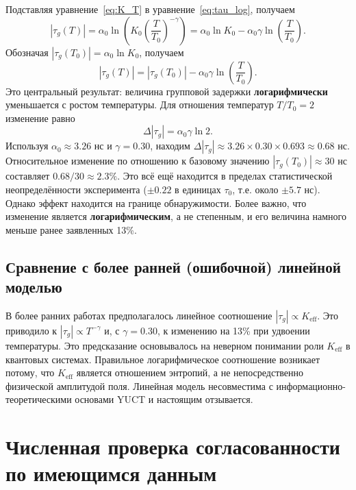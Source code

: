 \documentclass[12pt,a4paper]{article}
\newcommand{\Keff}{K_{\mathrm{eff}}}
\begin{document}
	Подставляя уравнение~\eqref{eq:K_T} в уравнение~\eqref{eq:tau_log}, получаем
	\begin{equation}
		|\tau_g(T)| = \alpha_0 \ln\!\left(K_0 \left(\frac{T}{T_0}\right)^{-\gamma}\right)
		= \alpha_0 \ln K_0 - \alpha_0 \gamma \ln\!\left(\frac{T}{T_0}\right).
	\end{equation}
	Обозначая \(|\tau_g(T_0)| = \alpha_0 \ln K_0\), получаем
	\begin{equation}
		|\tau_g(T)| = |\tau_g(T_0)| - \alpha_0 \gamma \ln\!\left(\frac{T}{T_0}\right).
		\label{eq:tau_T_log}
	\end{equation}
	Это центральный результат: величина групповой задержки \textbf{логарифмически} уменьшается с ростом температуры. Для отношения температур \(T/T_0 = 2\) изменение равно
	\begin{equation}
		\Delta |\tau_g| = \alpha_0 \gamma \ln 2.
	\end{equation}
	Используя \(\alpha_0 \approx 3.26\) нс и \(\gamma = 0.30\), находим \(\Delta |\tau_g| \approx 3.26 \times 0.30 \times 0.693 \approx 0.68\) нс. Относительное изменение по отношению к базовому значению \(|\tau_g(T_0)| \approx 30\) нс составляет \(0.68 / 30 \approx 2.3\%\). Это всё ещё находится в пределах статистической неопределённости эксперимента (\(\pm 0.22\) в единицах \(\tau_0\), т.е. около \(\pm 5.7\) нс). Однако эффект находится на границе обнаружимости. Более важно, что изменение является \textbf{логарифмическим}, а не степенным, и его величина намного меньше ранее заявленных 13\%.
	
	\subsection{Сравнение с более ранней (ошибочной) линейной моделью}
	
	В более ранних работах предполагалось линейное соотношение \(|\tau_g| \propto \Keff\). Это приводило к \(|\tau_g| \propto T^{-\gamma}\) и, с \(\gamma = 0.30\), к изменению на 13\% при удвоении температуры. Это предсказание основывалось на неверном понимании роли \(\Keff\) в квантовых системах. Правильное логарифмическое соотношение возникает потому, что \(\Keff\) является отношением энтропий, а не непосредственно физической амплитудой поля. Линейная модель несовместима с информационно-теоретическими основами YUCT и настоящим отзывается.
	
	\section{Численная проверка согласованности по имеющимся данным}
	
\end{document}
